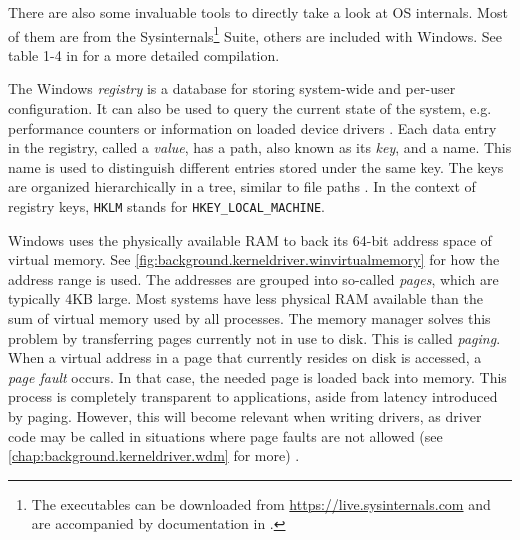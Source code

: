 There are also some invaluable tools to directly take a look at OS internals. Most of them are from the Sysinternals\footnote{\label{fn:background.kerneldriver.sysinternals} The executables can be downloaded from \url{https://live.sysinternals.com} and are accompanied by documentation in \cite{Russinovich2016}.} Suite, others are included with Windows. See table 1-4 in \cite{Yosifovich2017} for a more detailed compilation.

The Windows \emph{registry} is a database for storing system-wide and per-user configuration. It can also be used to query the current state of the system, e.g. performance counters or information on loaded device drivers \cite{Yosifovich2017}. Each data entry in the registry, called a \emph{value}, has a path, also known as its \emph{key}, and a name. This name is used to distinguish different entries stored under the same key. The keys are organized hierarchically in a tree, similar to file paths \cite{Registry2018}. In the context of registry keys, \texttt{HKLM} stands for \texttt{HKEY\_LOCAL\_MACHINE}.

Windows uses the physically available RAM to back its 64-bit address space of virtual memory. See \autoref{fig:background.kerneldriver.winvirtualmemory} for how the address range is used. The addresses are grouped into so-called \emph{pages}, which are typically 4KB large. Most systems have less physical RAM available than the sum of virtual memory used by all processes. The memory manager solves this problem by transferring pages currently not in use to disk. This is called \emph{paging}. When a virtual address in a page that currently resides on disk is accessed, a \emph{page fault} occurs. In that case, the needed page is loaded back into memory. This process is completely transparent to applications, aside from latency introduced by paging. However, this will become relevant when writing drivers, as driver code may be called in situations where page faults are not allowed (see \autoref{chap:background.kerneldriver.wdm} for more) \cite{Yosifovich2017}.

